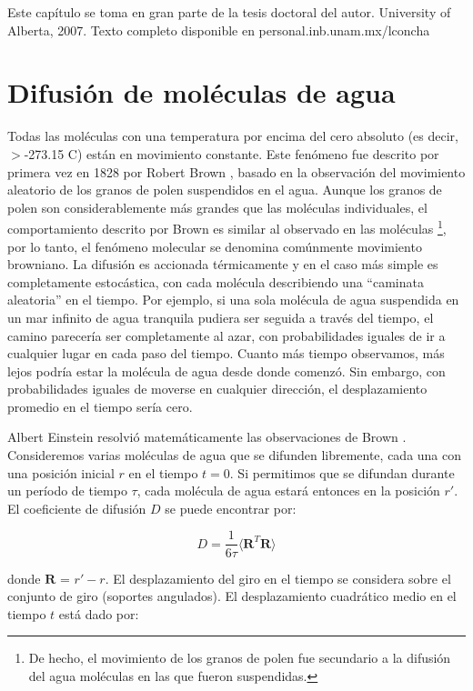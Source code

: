 
Este capítulo se toma en gran parte de la tesis doctoral del autor. University of Alberta, 2007. Texto completo disponible en personal.inb.unam.mx/lconcha

\section{Difusión de moléculas de agua}

Todas las moléculas con una temperatura por encima del cero absoluto (es decir, $>$-273.15 \textdegree{}C) están en movimiento constante. Este fenómeno fue descrito por primera vez en 1828 por Robert Brown \cite{Brown_1828}, basado en la observación del movimiento aleatorio de los granos de polen suspendidos en el agua. Aunque los granos de polen son considerablemente más grandes que las moléculas individuales, el comportamiento descrito por Brown es similar al observado en las moléculas \footnote{De hecho, el movimiento de los granos de polen fue secundario a la difusión del agua moléculas en las que fueron suspendidas.}, por lo tanto, el fenómeno molecular se denomina comúnmente movimiento browniano. La difusión es accionada térmicamente y en el caso más simple es completamente estocástica, con cada molécula describiendo una ``caminata aleatoria'' en el tiempo. Por ejemplo, si una sola molécula de agua suspendida en un mar infinito de agua tranquila pudiera ser seguida a través del tiempo, el camino parecería ser completamente al azar, con probabilidades iguales de ir a cualquier lugar en cada paso del tiempo. Cuanto más tiempo observamos, más lejos podría estar la molécula de agua desde donde comenzó. Sin embargo, con probabilidades iguales de moverse en cualquier dirección, el desplazamiento promedio en el tiempo sería cero.

Albert Einstein resolvió matemáticamente las observaciones de Brown \cite{Einstein_1905}. Consideremos varias moléculas de agua que se difunden libremente, cada una con una posición inicial $r$ en el tiempo {$t = 0$}. Si permitimos que se difundan durante un período de tiempo \(\tau\), cada molécula de agua estará entonces en la posición {$r'$}. El coeficiente de difusión {$D$} se puede encontrar por:

\begin{equation}
D = \frac{1}{6 \tau}  \langle \textbf{R}^T\textbf{R} \rangle
\end{equation}

donde $\textbf{R}$ = {$r'- r$}. El desplazamiento del giro en el tiempo se considera sobre el conjunto de giro (soportes angulados). El desplazamiento cuadrático medio en el tiempo {$t$} está dado por:


